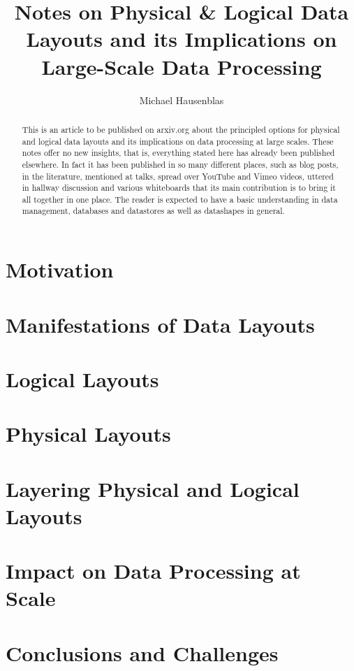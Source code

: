 \documentclass{llncs}
\begin{document}
\title{Notes on Physical & Logical Data Layouts and its Implications on Large-Scale Data Processing}
	\author{
	Michael Hausenblas 
	}
\maketitle

\begin{abstract}
This is an article to be published on arxiv.org about the principled options for physical and logical data layouts and its implications on data processing at large scales. These notes offer no new insights, that is, everything stated here has already been published elsewhere. In fact it has been published in so many different places, such as blog posts, in the literature, mentioned at talks, spread over YouTube and Vimeo videos, uttered in hallway discussion and various whiteboards that its main contribution is to bring it all together in one place. The reader is expected to have a basic understanding in data management, databases and datastores as well as datashapes in general.
\end{abstract}

\section{Motivation}
\label{sec:mot}

\section{Manifestations of Data Layouts}
\label{sec:mani}

\section{Logical Layouts}
\label{sec:loglay}

\section{Physical Layouts}
\label{sec:phylay}

\section{Layering Physical and Logical Layouts}
\label{sec:laylay}


\section{Impact on Data Processing at Scale}
\label{sec:ldp}


\section{Conclusions and Challenges}
\label{sec:concl}




\end{document}
